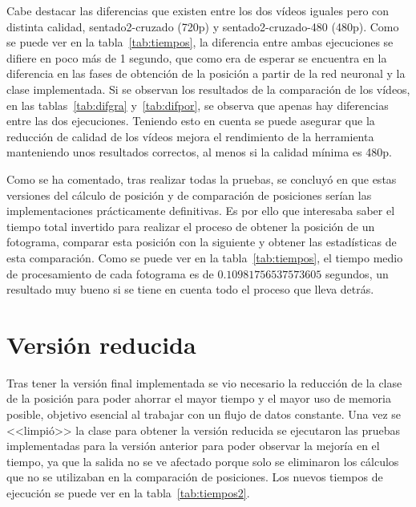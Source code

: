 {Cabe destacar las diferencias que existen entre los dos vídeos iguales pero con distinta calidad, sentado2-cruzado (720p) y sentado2-cruzado-480 (480p). Como se puede ver en la tabla~\ref{tab:tiempos}, la diferencia entre ambas ejecuciones se difiere en poco más de 1 segundo, que como era de esperar se encuentra en la diferencia en las fases de obtención de la posición a partir de la red neuronal y la clase implementada. Si se observan los resultados de la comparación de los vídeos, en las tablas~\ref{tab:difgra} y~\ref{tab:difpor}, se observa que apenas hay diferencias entre las dos ejecuciones. Teniendo esto en cuenta se puede asegurar que la reducción de calidad de los vídeos mejora el rendimiento de la herramienta manteniendo unos resultados correctos, al menos si la calidad mínima es 480p.

Como se ha comentado, tras realizar todas la pruebas, se concluyó en que estas versiones del cálculo de posición y de comparación de posiciones serían las implementaciones prácticamente definitivas. Es por ello que interesaba saber el tiempo total invertido para realizar el proceso de obtener la posición de un fotograma, comparar esta posición con la siguiente y obtener las estadísticas de esta comparación. Como se puede ver en la tabla~\ref{tab:tiempos}, el tiempo medio de procesamiento de cada fotograma es de $0.10981756537573605$ segundos, un resultado muy bueno si se tiene en cuenta todo el proceso que lleva detrás.

\section{Versión reducida}
Tras tener la versión final implementada se vio necesario la reducción de la clase de la posición para poder ahorrar el mayor tiempo y el mayor uso de memoria posible, objetivo esencial al trabajar con un flujo de datos constante. Una vez se <<limpió>> la clase para obtener la versión reducida se ejecutaron las pruebas implementadas para la versión anterior para poder observar la mejoría en el tiempo, ya que la salida no se ve afectado porque solo se eliminaron los cálculos que no se utilizaban en la comparación de posiciones. Los nuevos tiempos de ejecución se puede ver en la tabla~\ref{tab:tiempos2}.

}
